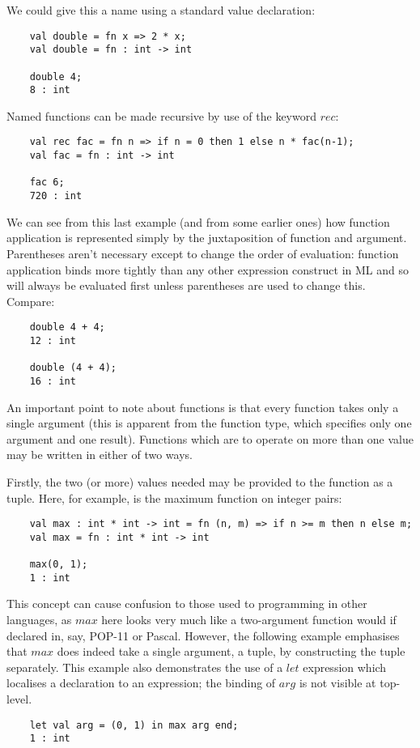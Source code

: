 We could give this a name using a standard value declaration:
\begin{verbatim}
    val double = fn x => 2 * x;
    val double = fn : int -> int

    double 4;
    8 : int
\end{verbatim}

Named functions can be made recursive by use of the keyword $rec$:
\begin{verbatim}
    val rec fac = fn n => if n = 0 then 1 else n * fac(n-1);
    val fac = fn : int -> int

    fac 6;
    720 : int
\end{verbatim}

We can see from this last example (and from some earlier ones) how
function application is represented simply by the juxtaposition of
function and argument. Parentheses aren't necessary except to change the
order of evaluation: function application binds more tightly than any
other expression construct in ML and so will always be evaluated first
unless parentheses are used to change this. Compare:
\begin{verbatim}
    double 4 + 4;
    12 : int

    double (4 + 4);
    16 : int
\end{verbatim}

An important point to note about functions is that every function takes
only a single argument (this is apparent from the function type, which
specifies only one argument and one result). Functions which are to
operate on more than one value may be written in either of two ways.

Firstly, the two (or more) values needed may be provided to the function
as a tuple. Here, for example, is the maximum function on integer pairs:
\begin{verbatim}
    val max : int * int -> int = fn (n, m) => if n >= m then n else m;
    val max = fn : int * int -> int

    max(0, 1);
    1 : int
\end{verbatim}

This concept can cause confusion to those used to programming in other
languages, as $max$ here looks very much like a two-argument function
would if declared in, say, POP-11 or Pascal. However, the following
example emphasises that $max$ does indeed take a single argument, a
tuple, by constructing the tuple separately. This example also
demonstrates the use of a $let$ expression which localises a declaration
to an expression; the binding of $arg$ is not visible at top-level.
\begin{verbatim}
    let val arg = (0, 1) in max arg end;
    1 : int
\end{verbatim}

